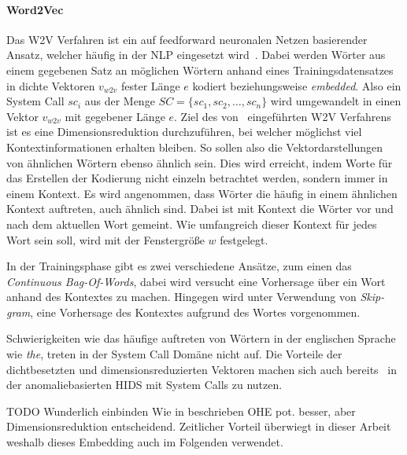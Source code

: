             \paragraph{Word2Vec}
                Das \ac{W2V} Verfahren ist ein auf feedforward neuronalen Netzen basierender Ansatz, welcher häufig in der \ac{NLP} eingesetzt wird~\cite{W2VAYYADEVARA2018}.
                Dabei werden Wörter aus einem gegebenen Satz an möglichen Wörtern anhand eines Trainingsdatensatzes in dichte Vektoren $v_{w2v}$ fester Länge $e$ kodiert beziehungsweise \textit{embedded}.
                Also ein System Call $sc_i$ aus der Menge $SC = \{sc_1,sc_2,\dots,sc_n\}$ wird umgewandelt in einen Vektor $v_{w2v}$ mit gegebener Länge $e$.
                Ziel des von~\cite{W2VMIKOLOV2013} eingeführten \ac{W2V} Verfahrens ist es eine Dimensionsreduktion durchzuführen, bei welcher möglichst viel Kontextinformationen erhalten bleiben.
                So sollen also die Vektordarstellungen von ähnlichen Wörtern ebenso ähnlich sein.
                Dies wird erreicht, indem Worte für das Erstellen der Kodierung nicht einzeln betrachtet werden, sondern immer in einem Kontext.
                Es wird angenommen, dass Wörter die häufig in einem ähnlichen Kontext auftreten, auch ähnlich sind.
                Dabei ist mit Kontext die Wörter vor und nach dem aktuellen Wort gemeint.
                Wie umfangreich dieser Kontext für jedes Wort sein soll, wird mit der Fenstergröße $w$ festgelegt.

                In der Trainingsphase gibt es zwei verschiedene Ansätze, zum einen das \textit{Continuous Bag-Of-Words},
                dabei wird versucht eine Vorhersage über ein Wort anhand des Kontextes zu machen.
                Hingegen wird unter Verwendung von \textit{Skip-gram}, eine Vorhersage des Kontextes aufgrund des Wortes vorgenommen.~\cite{EMBEDDINGPILEHVAR2020}

                Schwierigkeiten wie das häufige auftreten von Wörtern in der englischen Sprache wie \textit{the}, treten in der System Call Domäne nicht auf.
                Die Vorteile der dichtbesetzten und dimensionsreduzierten Vektoren machen sich auch bereits~\cite{IDSTHREADGRIMMER2021} in der anomaliebasierten \ac{HIDS} mit System Calls zu nutzen.

                {\color{red} TODO Wunderlich einbinden}
                Wie in \cite{W2VWUNDERLICH2019} beschrieben \ac{OHE} pot. besser, aber Dimensionsreduktion entscheidend.
                Zeitlicher Vorteil überwiegt in dieser Arbeit weshalb dieses Embedding auch im Folgenden verwendet.
                
